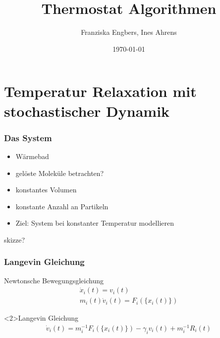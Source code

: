 \documentclass{beamer}
\title{Thermostat Algorithmen}
\author{Franziska Engbers, Ines Ahrens}
\date{\today}
\begin{document}
\maketitle
\frame{\tableofcontents[currentsection]}

\section{Temperatur Relaxation mit stochastischer Dynamik}

\begin{frame}
	\frametitle{Das System}
	\begin{itemize}
		\item Wärmebad
		\item gelöste Moleküle betrachten?
		\item konstantes Volumen
		\item konstante Anzahl an Partikeln
		\item Ziel: System bei konstanter Temperatur modellieren		
	\end{itemize}
	skizze?
\end{frame}

\begin{frame} 
  \frametitle{Langevin Gleichung}
  \begin{block}{Newtonsche Bewegungsgleichung} 
	\begin{align*}
	\dot{x}_i(t) = v_i(t) \\
	m_i(t) \dot{v}_i(t) = F_i(\{ x_i(t)\}) 
	\end{align*}
  \end{block}
  \begin{block}<2>{Langevin Gleichung} %
	\begin{align*}
	\dot{v}_i(t)  = m_i^{-1} F_i(\{x_i(t)\}) - \gamma_i v_i(t) + m_i^{-1} R_i(t)
	\end{align*}
  \end{block}  

\end{frame}
\end{document}

